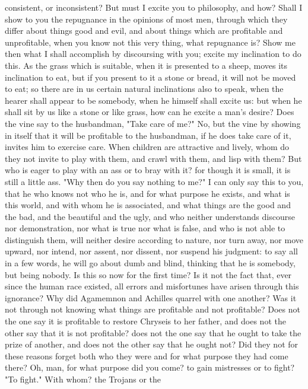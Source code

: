 \documentclass[a4paper]{article}
\begin{document}
consistent, or inconsistent? But must I excite you to philosophy, and how?
Shall I show to you the repugnance in the opinions of most men, through which
they differ about things good and evil, and about things which are profitable
and unprofitable, when you know not this very thing, what repugnance is? Show
me then what I shall accomplish by discoursing with you; excite my inclination
to do this. As the grass which is suitable, when it is presented to a sheep,
moves its inclination to eat, but if you present to it a stone or bread, it
will not be moved to eat; so there are in us certain natural inclinations also
to speak, when the hearer shall appear to be somebody, when he himself shall
excite us: but when he shall sit by us like a stone or like grass, how can he
excite a man's desire? Does the vine say to the husbandman, "Take care of me?"
No, but the vine by showing in itself that it will be profitable to the
husbandman, if he does take care of it, invites him to exercise care. When
children are attractive and lively, whom do they not invite to play with them,
and crawl with them, and lisp with them? But who is eager to play with an ass
or to bray with it? for though it is small, it is still a little ass.
    "Why then do you say nothing to me?" I can only say this to you, that he
who knows not who he is, and for what purpose he exists, and what is this
world, and with whom he is associated, and what things are the good and the
bad, and the beautiful and the ugly, and who neither understands discourse nor
demonstration, nor what is true nor what is false, and who is not able to
distinguish them, will neither desire according to nature, nor turn away, nor
move upward, nor intend, nor assent, nor dissent, nor suspend his judgment: to
say all in a few words, he will go about dumb and blind, thinking that he is
somebody, but being nobody. Is this so now for the first time? Is it not the
fact that, ever since the human race existed, all errors and misfortunes have
arisen through this ignorance? Why did Agamemnon and Achilles quarrel with one
another? Was it not through not knowing what things are profitable and not
profitable? Does not the one say it is profitable to restore Chryseis to her
father, and does not the other say that it is not profitable? does not the one
say that he ought to take the prize of another, and does not the other say that
he ought not? Did they not for these reasons forget both who they were and for
what purpose they had come there? Oh, man, for what purpose did you come? to
gain mistresses or to fight? "To fight." With whom? the Trojans or the
\end{document}
